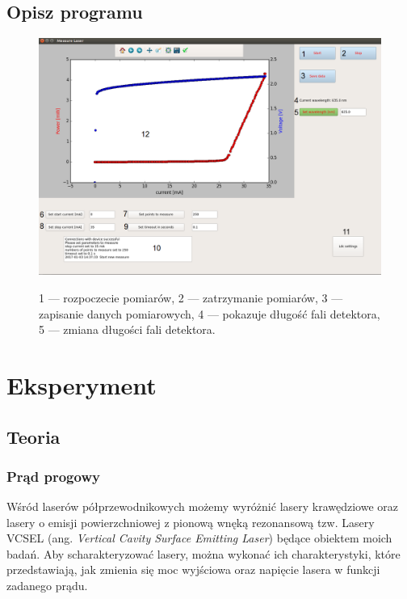 \documentclass[a4paper, portrait,12pt]{mwrep}
\begin{document}
\section{Opisz programu}
\begin{figure}[h]
\center
  \includegraphics[scale=0.35]{gui.png}
  \label{rys1}
  \caption{1 --- rozpoczecie pomiarów, 2 --- zatrzymanie pomiarów, 3 --- zapisanie danych pomiarowych, 4 --- pokazuje długość fali detektora, 5 --- zmiana długości fali detektora.} 
\end{figure}
\chapter{Eksperyment} \label{Eksperyment}
\section{Teoria}
\subsection{Prąd progowy}
Wśród laserów półprzewodnikowych możemy wyróżnić lasery krawędziowe oraz lasery o emisji powierzchniowej z pionową wnęką rezonansową tzw. Lasery VCSEL (ang. \textit{Vertical Cavity Surface Emitting Laser}) będące obiektem moich badań. Aby scharakteryzować lasery, można wykonać ich charakterystyki, które przedstawiają, jak zmienia się moc wyjściowa oraz napięcie lasera w funkcji zadanego prądu.
\end{document}
